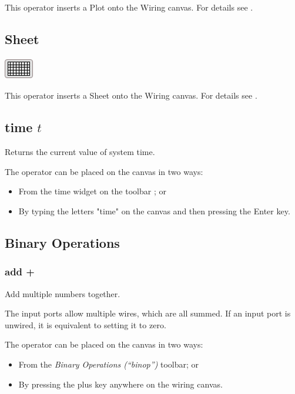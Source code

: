 This operator inserts a Plot onto the Wiring canvas. For details see
.

\subsection{Sheet}
\begin{center}
  \includegraphics{images/sheet}
\end{center}

This operator inserts a Sheet onto the Wiring canvas. For details
see .

\subsection{time $t$}

\label{Operation:time} Returns the current value of system time.

The operator can be placed on the canvas in two ways:
\begin{itemize}
\item From the time widget on the toolbar ;
or 
\item By typing the letters "time" on the canvas and then pressing the
Enter key.
\end{itemize}

\subsection{Binary Operations}

\label{Binary-Operations}\label{operations-binop}

\subsubsection{add +}


\label{Operation:add} Add multiple numbers together.

The input ports allow multiple wires, which are all summed. If an
input port is unwired, it is equivalent to setting it to zero.

The operator can be placed on the canvas in two ways:
\begin{itemize}
\item From the \emph{Binary Operations (``binop'') }toolbar; or 
\item By pressing the plus key anywhere on the wiring canvas. 
\end{itemize}

